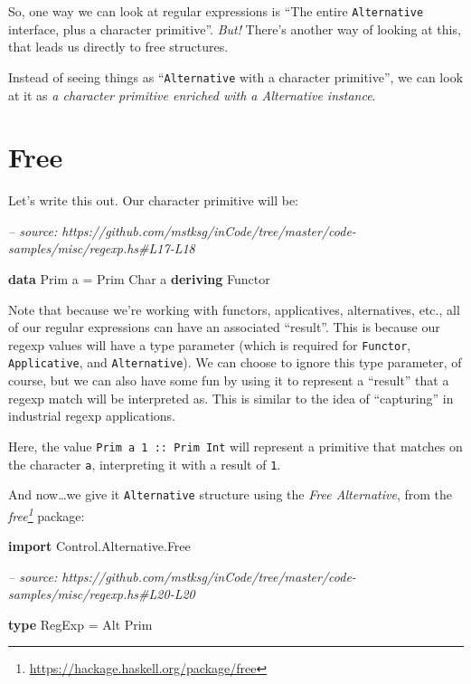 \documentclass[]{article}
\newenvironment{Shaded}{}{}
\newcommand{\CommentTok}[1]{\textcolor[rgb]{0.38,0.63,0.69}{\textit{#1}}}
\newcommand{\DataTypeTok}[1]{\textcolor[rgb]{0.56,0.13,0.00}{#1}}
\newcommand{\FunctionTok}[1]{\textcolor[rgb]{0.02,0.16,0.49}{#1}}
\newcommand{\KeywordTok}[1]{\textcolor[rgb]{0.00,0.44,0.13}{\textbf{#1}}}
\newcommand{\NormalTok}[1]{#1}
\renewcommand{\href}[2]{#2\footnote{\url{#1}}}
\begin{document}
So, one way we can look at regular expressions is ``The entire
\texttt{Alternative} interface, plus a character primitive''. \emph{But!}
There's another way of looking at this, that leads us directly to free
structures.

Instead of seeing things as ``\texttt{Alternative} with a character primitive'',
we can look at it as \emph{a character primitive enriched with a Alternative
instance}.

\hypertarget{free}{%
\section{Free}\label{free}}

Let's write this out. Our character primitive will be:

\begin{Shaded}
\begin{Highlighting}[]
\CommentTok{-- source: https://github.com/mstksg/inCode/tree/master/code-samples/misc/regexp.hs#L17-L18}

\KeywordTok{data} \DataTypeTok{Prim}\NormalTok{ a }\FunctionTok{=} \DataTypeTok{Prim} \DataTypeTok{Char}\NormalTok{ a}
  \KeywordTok{deriving} \DataTypeTok{Functor}
\end{Highlighting}
\end{Shaded}

Note that because we're working with functors, applicatives, alternatives, etc.,
all of our regular expressions can have an associated ``result''. This is
because our regexp values will have a type parameter (which is required for
\texttt{Functor}, \texttt{Applicative}, and \texttt{Alternative}). We can choose
to ignore this type parameter, of course, but we can also have some fun by using
it to represent a ``result'' that a regexp match will be interpreted as. This is
similar to the idea of ``capturing'' in industrial regexp applications.

Here, the value
\texttt{Prim\ \textquotesingle{}a\textquotesingle{}\ 1\ ::\ Prim\ Int} will
represent a primitive that matches on the character \texttt{a}, interpreting it
with a result of \texttt{1}.

And now\ldots{}we give it \texttt{Alternative} structure using the \emph{Free
Alternative}, from the
\emph{\href{https://hackage.haskell.org/package/free}{free}} package:

\begin{Shaded}
\begin{Highlighting}[]
\KeywordTok{import} \DataTypeTok{Control.Alternative.Free}

\CommentTok{-- source: https://github.com/mstksg/inCode/tree/master/code-samples/misc/regexp.hs#L20-L20}

\KeywordTok{type} \DataTypeTok{RegExp} \FunctionTok{=} \DataTypeTok{Alt} \DataTypeTok{Prim}
\end{Highlighting}
\end{Shaded}
\end{document}
